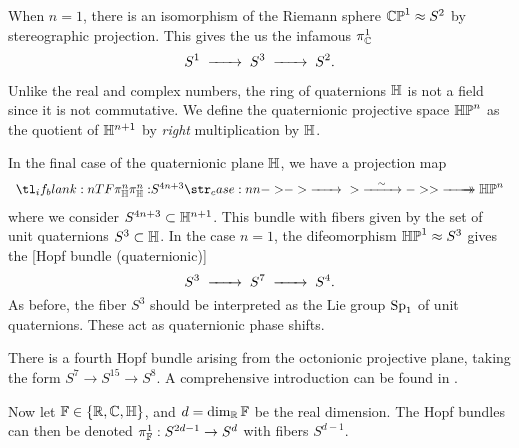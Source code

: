 When $n=1$, there is an isomorphism of the Riemann sphere $\mathbb{CP}^1\approx S^2$ by stereographic projection. This gives the us the infamous  $\pi_{\mathbb{C}}^1$
\[
	S^1 \lkxto S^3 \lkxto S^2.
\]

\begin{remark*}
	Unlike the real and complex numbers, the ring of quaternions $\mathbb{H}$ is not a field since it is not commutative. We define the quaternionic projective space $\mathbb{HP}^{n}$ as the quotient of $\mathbb{H}^{n+1}$ by {\normalfont\emph{right}} multiplication by $\mathbb{H}$.
\end{remark*}

In the final case of the quaternionic plane $\mathbb{H}$, we have a projection map
\[
	\lkxfunc{\pi_\HH^n}{S^{4n+3}}{\HP^n}
\]
where we consider $S^{4n+3}\subset \mathbb{H}^{n+1}$. This bundle with fibers given by the set of unit quaternions $S^3\subset \mathbb{H}$.
In the case $n=1$, the difeomorphism $\mathbb{HP}^1\approx S^3$ gives the [Hopf bundle (quaternionic)]
\[
	S^3 \lkxto S^7 \lkxto S^4.
\]
As before, the fiber $S^3$ should be interpreted as the Lie group $\mathrm{Sp}_1$ of unit quaternions. These act as quaternionic phase shifts.

\begin{remark*}
	There is a fourth Hopf bundle arising from the octonionic projective plane, taking the form $S^7\to S^{15}\to S^8$. A comprehensive introduction can be found in \cite{baez2002octonions}.
\end{remark*}

Now let $\mathbb{F}\in\{\mathbb{R}, \mathbb{C}, \mathbb{H}\}$, and $d=\dim_{\mathbb{R}} \mathbb{F}$ be the real dimension. The Hopf bundles can then be denoted $\pi_{\mathbb{F}}^1 : S^{2d-1} \to S^d$ with fibers $S^{d-1}$.


